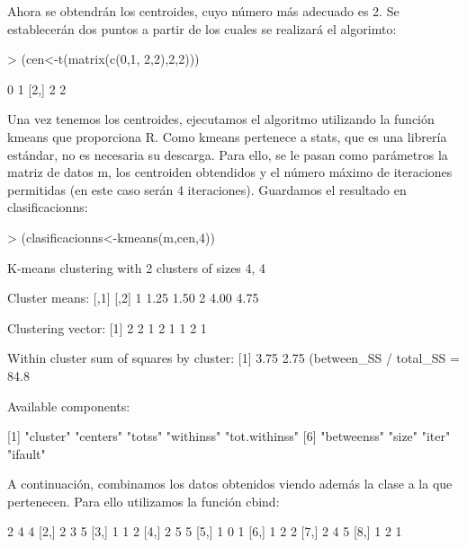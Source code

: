 \documentclass [a4paper] {article}
\begin{document}
Ahora se obtendrán los centroides, cuyo número más adecuado es 2. Se establecerán dos puntos a partir de los cuales se realizará el algorimto:

\begin{Schunk}
\begin{Sinput}
> (cen<-t(matrix(c(0,1, 2,2),2,2)))
\end{Sinput}
\begin{Soutput}
     [,1] [,2]
[1,]    0    1
[2,]    2    2
\end{Soutput}
\end{Schunk}

Una vez tenemos los centroides, ejecutamos el algoritmo utilizando la función kmeans que proporciona R. Como kmeans pertenece a stats, que es una librería estándar, no es necesaria su descarga. Para ello, se le pasan como parámetros la matriz de datos m, los centroiden obtendidos y el número máximo de iteraciones permitidas (en este caso serán 4 iteraciones). Guardamos el resultado en clasificacionns:

\begin{Schunk}
\begin{Sinput}
> (clasificacionns<-kmeans(m,cen,4))
\end{Sinput}
\begin{Soutput}
K-means clustering with 2 clusters of sizes 4, 4

Cluster means:
  [,1] [,2]
1 1.25 1.50
2 4.00 4.75

Clustering vector:
[1] 2 2 1 2 1 1 2 1

Within cluster sum of squares by cluster:
[1] 3.75 2.75
 (between_SS / total_SS =  84.8 %

Available components:

[1] "cluster"      "centers"      "totss"        "withinss"     "tot.withinss"
[6] "betweenss"    "size"         "iter"         "ifault"      
\end{Soutput}
\end{Schunk}

A continuación, combinamos los datos obtenidos viendo además la clase a la que pertenecen. Para ello utilizamos la función cbind:

\begin{Schunk}
\begin{Soutput}
     [,1] [,2] [,3]
[1,]    2    4    4
[2,]    2    3    5
[3,]    1    1    2
[4,]    2    5    5
[5,]    1    0    1
[6,]    1    2    2
[7,]    2    4    5
[8,]    1    2    1
\end{Soutput}
\end{Schunk}
\end{document}
